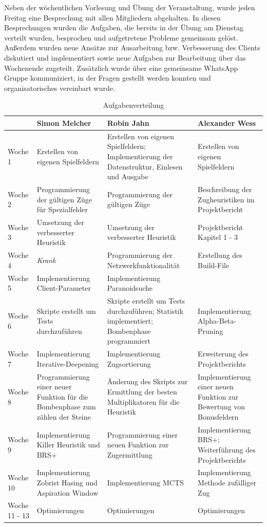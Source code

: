 \documentclass[12pt,a4paper,bibliography=totocnumbered,listof=totocnumbered]{article}
\begin{document}
Neben der wöchentlichen Vorlesung und Übung der Veranstaltung, wurde jeden Freitag eine Besprechung mit allen Mitgliedern abgehalten. In diesen Besprechungen wurden die Aufgaben, die bereits in der Übung am Dienstag verteilt wurden, besprochen und aufgetretene Probleme gemeinsam gelöst. Außerdem wurden neue Ansätze zur Ausarbeitung bzw. Verbesserung des Clients diskutiert und implementiert sowie neue Aufgaben zur Bearbeitung über das Wochenende zugeteilt. Zusätzlich wurde über eine gemeinsame WhatsApp Gruppe kommuniziert, in der Fragen gestellt werden konnten und organisatorisches vereinbart wurde.

\vspace{1em}
\begin{table}[H]
\centering
	\begin{tabular} {| m{2.6cm} | m{4cm} | m{4cm} | m{4cm}|}
		\hline
		\textbf{} &\textbf{Simon Melcher} & \textbf{Robin Jahn} & \textbf{Alexander Wess}\\
		\hline
		Woche 1 & Erstellen von eigenen Spielfeldern & Erstellen von eigenen Spielfeldern; Implementierung der Datenstruktur, Einlesen und Ausgabe & Erstellen von eigenen Spielfeldern\\
		\hline
		Woche 2 & Programmierung der gültigen Züge für Spezialfelder & Programmierung der gültigen Züge & Beschreibung der Zugheuristiken im Projektbericht\\
		\hline
		Woche 3 & Umsetzung der verbesserter Heuristik & Umsetzung der verbesserter Heuristik & Projektbericht Kapitel 1 - 3\\
		\hline
		Woche 4 & \textit{Krank} & Programmierung der Netzwerkfunktionalität & Erstellung des Build-File\\
		\hline
		Woche 5 & Implementierung Client-Parameter & Implementierung Paranoidsuche &\\
		\hline
		Woche 6 & Skripte erstellt um Tests durchzuführen & Skripte erstellt um Tests durchzuführen; Statistik implementiert; Bombenphase programmiert & Implementierung Alpha-Beta-Pruning\\
		\hline
		Woche 7 & Implementierung Iterative-Deepening & Implementierung Zugsortierung & Erweiterung des Projektberichts\\
		\hline
		Woche 8 & Programmierung einer neuer Funktion für die Bombenphase zum zählen der Steine & Änderung des Skripts zur Ermittlung der besten Multiplikatoren für die Heuristik & Implementierung einer neuen Funktion zur Bewertung von Bonusfeldern\\
		\hline
		Woche 9 & Implementierung Killer Heuristik und BRS+ & Programmierung einer neuen Funktion zur Zugermittlung & Implementierung BRS+; Weiterführung des Projektberichts\\
		\hline
		Woche 10 & Implementierung Zobrist Hasing und Aspiration Window & Implementierung MCTS & Implementierung Methode zufälliger Zug\\
		\hline
		Woche 11 - 13 & Optimierungen & Optimierungen & Optimierungen\\
		\hline
	\end{tabular}
	\caption{Aufgabenverteilung}
	\label{tab:tasks}
\end{table}
\end{document}
